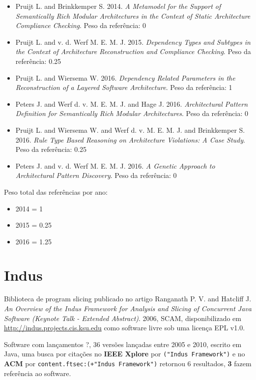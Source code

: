 \begin{itemize}
\item Pruijt L. and Brinkkemper S.
      2014.
      {\it A Metamodel for the Support of Semantically Rich Modular Architectures in the Context of Static Architecture Compliance Checking}.
      Peso da referência: 0
\item Pruijt L. and v. d. Werf M. E. M. J.
      2015.
      {\it Dependency Types and Subtypes in the Context of Architecture Reconstruction and Compliance Checking}.
      Peso da referência: 0.25
\item Pruijt L. and Wiersema W.
      2016.
      {\it Dependency Related Parameters in the Reconstruction of a Layered Software Architecture}.
      Peso da referência: 1
\item Peters J. and Werf d. v. M. E. M. J. and Hage J.
      2016.
      {\it Architectural Pattern Definition for Semantically Rich Modular Architectures}.
      Peso da referência: 0
\item Pruijt L. and Wiersema W. and Werf d. v. M. E. M. J. and Brinkkemper S.
      2016.
      {\it Rule Type Based Reasoning on Architecture Violations: A Case Study}.
      Peso da referência: 0.25
\item Peters J. and v. d. Werf M. E. M. J.
      2016.
      {\it A Genetic Approach to Architectural Pattern Discovery}.
      Peso da referência: 0
\end{itemize}

Peso total das referências por ano:

\begin{itemize}
\item 2014 = 1
\item 2015 = 0.25
\item 2016 = 1.25
\end{itemize}


\section{Indus}

Biblioteca de program slicing
publicado no artigo
Ranganath P. V. and Hatcliff J.
{\it An Overview of the Indus Framework for Analysis and Slicing of Concurrent Java Software (Keynote Talk - Extended Abstract)}.
2006,
SCAM,
disponibilizado em \url{http://indus.projects.cis.ksu.edu}
como software livre
sob uma licença EPL v1.0.

Software com lançamentos ?,
36 versões lançadas
entre 2005 e 2010,
escrito em Java,
uma busca por citações no {\bf IEEE Xplore} por
\texttt{("Indus Framework")}
e no {\bf ACM} por
\texttt{content.ftsec:(+"Indus Framework")}
retornou
6 resultados,
{\bf 3} fazem referência ao software.

